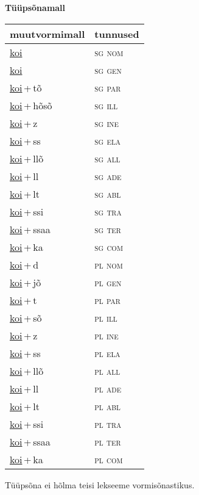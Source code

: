 
\vspace{1.8em}
\begin{minipage}{\textwidth}
\textbf{Tüüpsõnamall \,}\\

\begin{sideways}
\begin{tabular}{l l}
muutvormimall & tunnused \\
\hline
\underline{koi} & \textsc{ sg nom } \\
\underline{koi} & \textsc{ sg gen } \\
\underline{koi}\,+\,tõ & \textsc{ sg par } \\
\underline{koi}\,+\,hõsõ & \textsc{ sg ill } \\
\underline{koi}\,+\,z & \textsc{ sg ine } \\
\underline{koi}\,+\,ss & \textsc{ sg ela } \\
\underline{koi}\,+\,llõ & \textsc{ sg all } \\
\underline{koi}\,+\,ll & \textsc{ sg ade } \\
\underline{koi}\,+\,lt & \textsc{ sg abl } \\
\underline{koi}\,+\,ssi & \textsc{ sg tra } \\
\underline{koi}\,+\,ssaa & \textsc{ sg ter } \\
\underline{koi}\,+\,ka & \textsc{ sg com } \\
\underline{koi}\,+\,d & \textsc{ pl nom } \\
\underline{koi}\,+\,jõ & \textsc{ pl gen } \\
\underline{koi}\,+\,t & \textsc{ pl par } \\
\underline{koi}\,+\,sõ & \textsc{ pl ill } \\
\underline{koi}\,+\,z & \textsc{ pl ine } \\
\underline{koi}\,+\,ss & \textsc{ pl ela } \\
\underline{koi}\,+\,llõ & \textsc{ pl all } \\
\underline{koi}\,+\,ll & \textsc{ pl ade } \\
\underline{koi}\,+\,lt & \textsc{ pl abl } \\
\underline{koi}\,+\,ssi & \textsc{ pl tra } \\
\underline{koi}\,+\,ssaa & \textsc{ pl ter } \\
\underline{koi}\,+\,ka & \textsc{ pl com } \\
\end{tabular}
\end{sideways}
\label{tab:tüüpsõnamall-koi}

\end{minipage}

 
\vspace{1em}
\noindent Tüüpsõna ei hõlma teisi lekseeme vormi\-sõnastikus.
